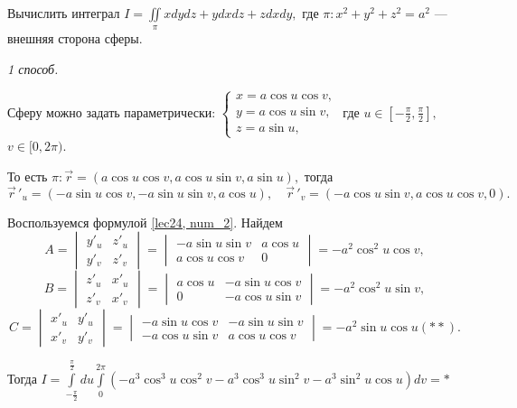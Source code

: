 \documentclass[../../main.tex]{subfiles}
\begin{document}
\begin{example}
	Вычислить интеграл $I = \iint\limits_\pi xdydz + ydxdz + zdxdy,$ где $\pi:
	 x^2 + y^2 + z^2 = a^2$ --- внешняя сторона сферы.
	\smallskip
	
	\emph{1 способ.}
		
	Сферу можно задать параметрически:
	$\begin{cases}	x = a \cos u \cos v,\\
		y = a \cos u \sin v,\\
		z = a \sin u,
	\end{cases} $
	где $u \in [-\frac{\pi}{2}, \frac{\pi}{2}],$ $v \in [0, 2\pi).$
	
	То есть $\pi: \vec{r} = ( a \cos u \cos v,  a \cos u \sin v, a \sin u),$ 
	тогда \[\vec r\,'_u = (-a \sin u \cos v, -a \sin u \sin v, a \cos u),\quad
	 \vec r\,'_v = (-a \cos u \sin v, a \cos u \cos v, 0).\]
	
	Воспользуемся формулой \eqref{lec24, num_2}. Найдем \[A=\begin{vmatrix}
	y'_u & z'_u\\
	y'_v & z'_v
	\end{vmatrix} = \begin{vmatrix}
	-a \sin u \sin v & a \cos u\\
	 a \cos u \cos v & 0
	\end{vmatrix} = -a^2 \cos^2 u \cos v,\] \[B=\begin{vmatrix}
	z'_u & x'_u\\
	z'_v & x'_v
	\end{vmatrix} = \begin{vmatrix}
	a \cos u & -a \sin u \cos v\\
	0 & -a \cos u \sin v
	\end{vmatrix} = -a^2 \cos^2 u \sin v,\]
	\[C=\begin{vmatrix}
	x'_u & y'_u\\
	x'_v & y'_v
	\end{vmatrix} = \begin{vmatrix}
	-a \sin u \cos v & -a \sin u \sin v\\
	-a \cos u \sin v & a \cos u \cos v
	\end{vmatrix} = -a^2 \sin u \cos u(**).\]
	
	Тогда $I = \int\limits_{-\frac{\pi}{2}}^{\frac{\pi}{2}}du\int\limits_0^
	{2\pi}(-a^3\cos^3 u \cos^2 v - a^3\cos^3 u \sin^2 v - a^3\sin^2 u \cos u)dv
	 = *$
	

\end{example}
\end{document}
